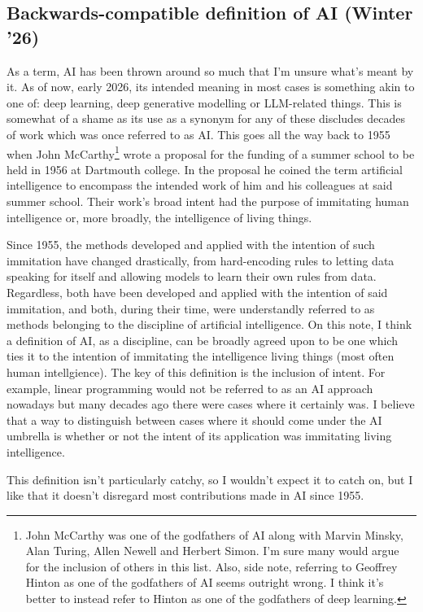 \documentclass[11pt]{article}
\begin{document}
\begin{appendices}
\subsection{Backwards-compatible definition of AI (Winter '26)}
As a term, AI has been thrown around so much that I'm unsure what's meant by it. As of now, early 2026, its intended meaning in most cases is something akin to one of: deep learning, deep generative modelling or LLM-related things. This is somewhat of a shame as its use as a synonym for any of these discludes decades of work which was once referred to as AI. This goes all the way back to 1955 when John McCarthy\footnote{John McCarthy was one of the godfathers of AI along with Marvin Minsky, Alan Turing, Allen Newell and Herbert Simon. I'm sure many would argue for the inclusion of others in this list. Also, side note, referring to Geoffrey Hinton as one of the godfathers of AI seems outright wrong. I think it's better to instead refer to Hinton as one of the godfathers of deep learning.} wrote a proposal for the funding of a summer school to be held in 1956 at Dartmouth college. In the proposal he coined the term artificial intelligence to encompass the intended work of him and his colleagues at said summer school. Their work's broad intent had the purpose of immitating human intelligence or, more broadly, the intelligence of living things.

Since 1955, the methods developed and applied with the intention of such immitation have changed drastically, from hard-encoding rules to letting data speaking for itself and allowing models to learn their own rules from data. Regardless, both have been developed and applied with the intention of said immitation, and both, during their time, were understandly referred to as methods belonging to the discipline of artificial intelligence. On this note, I think a definition of AI, as a discipline, can be broadly agreed upon to be one which ties it to the intention of immitating the intelligence living things (most often human intellgience). The key of this definition is the inclusion of intent. For example, linear programming would not be referred to as an AI approach nowadays but many decades ago there were cases where it certainly was. I believe that a way to distinguish between cases where it should come under the AI umbrella is whether or not the intent of its application was immitating living intelligence.

This definition isn't particularly catchy, so I wouldn't expect it to catch on, but I like that it doesn't disregard most contributions made in AI since 1955.


\end{appendices}
\end{document}
